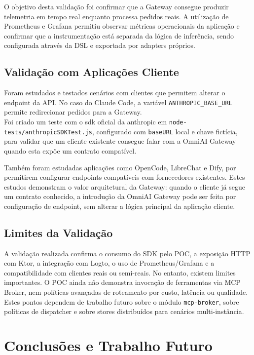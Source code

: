 \documentclass[11pt,a4paper]{report}
\begin{document}
    O objetivo desta validação foi confirmar que a Gateway consegue produzir telemetria em tempo real enquanto processa pedidos reais. A utilização de Prometheus e Grafana permitiu observar métricas operacionais da aplicação e confirmar que a instrumentação está separada da lógica de inferência, sendo configurada através da DSL e exportada por adapters próprios.

    \section{Validação com Aplicações Cliente}
    Foram estudados e testados cenários com clientes que permitem alterar o endpoint da API. No caso do Claude Code, a variável \texttt{ANTHROPIC\_BASE\_URL} permite redirecionar pedidos para a Gateway. \\
    Foi criado um teste com o sdk oficial da anthropic em \texttt{node-tests/anthropicSDKTest.js}, configurado com \texttt{baseURL} local e chave fictícia, para validar que um cliente existente consegue falar com a OmniAI Gateway quando esta expõe um contrato compatível.

    Também foram estudadas aplicações como OpenCode, LibreChat e Dify, por permitirem configurar endpoints compatíveis com fornecedores existentes. Estes estudos demonstram o valor arquitetural da Gateway: quando o cliente já segue um contrato conhecido, a introdução da OmniAI Gateway pode ser feita por configuração de endpoint, sem alterar a lógica principal da aplicação cliente.

    \section{Limites da Validação}
    A validação realizada confirma o consumo do SDK pelo POC, a exposição HTTP com Ktor, a integração com Logto, o uso de Prometheus/Grafana e a compatibilidade com clientes reais ou semi-reais. No entanto, existem limites importantes. O POC ainda não demonstra invocação de ferramentas via MCP Broker, nem políticas avançadas de roteamento por custo, latência ou qualidade. Estes pontos dependem de trabalho futuro sobre o módulo \texttt{mcp-broker}, sobre políticas de dispatcher e sobre stores distribuídos para cenários multi-instância.

    \chapter{Conclusões e Trabalho Futuro}
\end{document}
